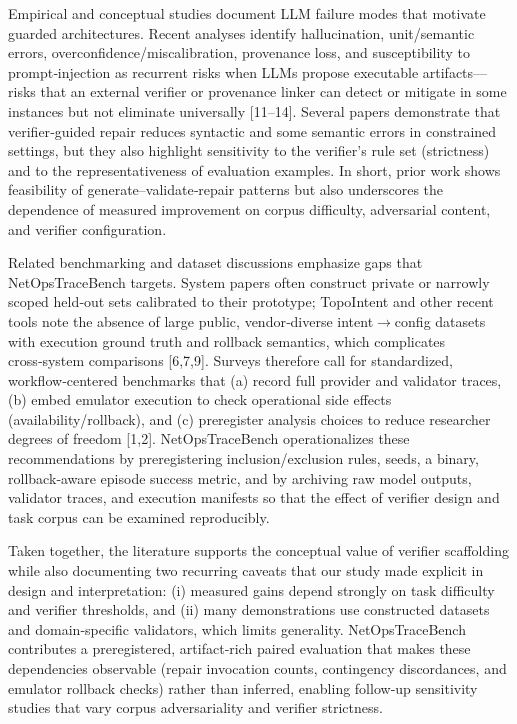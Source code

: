 \documentclass[conference]{IEEEtran}
\begin{document}
Empirical and conceptual studies document LLM failure modes that motivate guarded architectures. Recent analyses identify hallucination, unit/semantic errors, overconfidence/miscalibration, provenance loss, and susceptibility to prompt‑injection as recurrent risks when LLMs propose executable artifacts---risks that an external verifier or provenance linker can detect or mitigate in some instances but not eliminate universally [11--14]. Several papers demonstrate that verifier‑guided repair reduces syntactic and some semantic errors in constrained settings, but they also highlight sensitivity to the verifier's rule set (strictness) and to the representativeness of evaluation examples. In short, prior work shows feasibility of generate--validate‑repair patterns but also underscores the dependence of measured improvement on corpus difficulty, adversarial content, and verifier configuration.

Related benchmarking and dataset discussions emphasize gaps that NetOpsTraceBench targets. System papers often construct private or narrowly scoped held‑out sets calibrated to their prototype; TopoIntent and other recent tools note the absence of large public, vendor‑diverse intent\ensuremath{\rightarrow}config datasets with execution ground truth and rollback semantics, which complicates cross‑system comparisons [6,7,9]. Surveys therefore call for standardized, workflow‑centered benchmarks that (a) record full provider and validator traces, (b) embed emulator execution to check operational side effects (availability/rollback), and (c) preregister analysis choices to reduce researcher degrees of freedom [1,2]. NetOpsTraceBench operationalizes these recommendations by preregistering inclusion/exclusion rules, seeds, a binary, rollback‑aware episode success metric, and by archiving raw model outputs, validator traces, and execution manifests so that the effect of verifier design and task corpus can be examined reproducibly.

Taken together, the literature supports the conceptual value of verifier scaffolding while also documenting two recurring caveats that our study made explicit in design and interpretation: (i) measured gains depend strongly on task difficulty and verifier thresholds, and (ii) many demonstrations use constructed datasets and domain‑specific validators, which limits generality. NetOpsTraceBench contributes a preregistered, artifact‑rich paired evaluation that makes these dependencies observable (repair invocation counts, contingency discordances, and emulator rollback checks) rather than inferred, enabling follow‑up sensitivity studies that vary corpus adversariality and verifier strictness.
\end{document}
